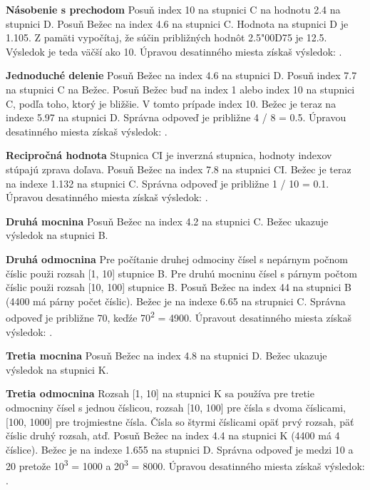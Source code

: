 \begin{multicols*}{3}
{  \textbf{Násobenie s prechodom}
Posuň index 10 na stupnici C na hodnotu 2.4 na stupnici D.
Posuň Bežec na index 4.6 na stupnici C.
Hodnota na stupnici D je 1.105.
Z pamäti vypočítaj, že súčin približných hodnôt 2.5{\char"00D7}5 je 12.5.
Výsledok je teda väčší ako 10.
Úpravou desatinného miesta získaš výsledok: . 

  \textbf{Jednoduché delenie}
Posuň Bežec na index 4.6 na stupnici D.
Posuň index 7.7 na stupnici C na Bežec.
Posuň Bežec buď na index 1 alebo index 10 na stupnici C, podľa toho, ktorý je bližšie. V tomto prípade index 10.
Bežec je teraz na indexe 5.97 na stupnici D. Správna odpoveď je približne 4 / 8 = 0.5. Úpravou desatinného miesta získaš výsledok: .

  \textbf{Recipročná hodnota}
\footnotesize Stupnica CI je inverzná stupnica, hodnoty indexov stúpajú zprava doľava. \normalsize
Posuň Bežec na index 7.8 na stupnici CI.
Bežec je teraz na indexe 1.132 na stupnici C.
Správna odpoveď je približne 1 / 10 = 0.1. Úpravou desatinného miesta získaš výsledok: .

  \textbf{Druhá mocnina}
Posuň Bežec na index 4.2 na stupnici C.
Bežec ukazuje výsledok  na stupnici B.

  \textbf{Druhá odmocnina}
\footnotesize Pre počítanie druhej odmociny čísel s nepárnym počnom číslic použi rozsah [1, 10] stupnice B. Pre druhú mocninu čísel s párnym počtom číslic použi rozsah [10, 100] stupnice B. \normalsize
{}
Posuň Bežec na index 44 na stupnici B (4400 má párny počet číslic).
Bežec je na indexe 6.65 na strupnici C. Správna odpoveď je približne 70, keďźe 70\textsuperscript{2} = 4900. Úpravout desatinného miesta získaš výsledok: .

  \textbf{Tretia mocnina}
Posuň Bežec na index 4.8 na stupnici D.
Bežec ukazuje výsledok  na stupnici K.

  \textbf{Tretia odmocnina}
\footnotesize Rozsah [1, 10] na stupnici K sa používa pre tretie odmocniny čísel s jednou číslicou, rozsah [10, 100] pre čísla s dvoma číslicami, [100, 1000] pre trojmiestne čísla. Čísla so štyrmi číslicami opäť prvý rozsah, päť číslic druhý rozsah, atď. \normalsize
{}
Posuň Bežec na index 4.4 na stupnici K (4400 má 4 číslice).
Bežec je na indexe 1.655 na stupnici D.
Správna odpoveď je medzi 10 a 20 pretože 10\textsuperscript{3} = 1000 a 20\textsuperscript{3} = 8000. Úpravou desatinného miesta získaš výsledok: .

}
\end{multicols*}
